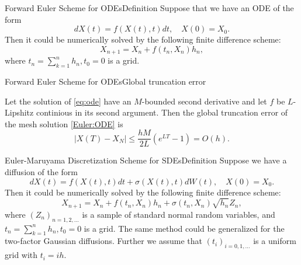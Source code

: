 \begin{frame}{Forward Euler Scheme for ODEs}{Definition}
    Suppose that we have an ODE of the form
    \begin{equation}
        dX(t) = f(X(t), t)dt, \quad X(0) = X_0. \label{eq:ode}
    \end{equation}
    Then it could be numerically solved by the following finite difference scheme:
    \begin{equation}
        X_{n+1} = X_n + f(t_n, X_n)h_n, \label{Euler:ODE}
    \end{equation}
    where $t_n = \sum_{k=1}^n h_n, t_0 = 0$ is a grid. 
\end{frame}

\begin{frame}{Forward Euler Scheme for ODEs}{Global truncation error}
    \begin{lemma}
        Let the solution of \eqref{eq:ode} have an $M$-bounded second derivative and let $f$ be $L$-Lipshitz continious in its second argument. Then the global truncation error of the mesh solution \eqref{Euler:ODE} is
        \begin{equation}
            \left|X(T) - X_N\right| \leq \frac{hM}{2L}\left(e^{LT} - 1\right) = O(h).
        \end{equation}
    \end{lemma}
\end{frame}

\begin{frame}{Euler-Maruyama Discretization Scheme for SDEs}{Definition}
    Suppose we have a diffusion of the form 
    \begin{equation*}
        dX(t) = f(X(t), t)dt + \sigma(X(t), t)dW(t), \quad X(0) = X_0.
    \end{equation*}
    Then it could be numerically solved by the following finite difference scheme:
    \begin{equation}
        X_{n+1} = X_n + f(t_n, X_n)h_n + \sigma(t_n, X_n) \sqrt{h_n} Z_n, \label{Euler:SDE}
    \end{equation}
    where $(Z_n)_{n=1, 2, \dots}$ is a sample of standard normal random variables, and $t_n = \sum_{k=1}^n h_n, t_0 = 0$ is a grid.
    The same method could be generalized for the two-factor Gaussian diffusions. Further we assume
    that $(t_i)_{i = 0, 1, \dots}$ is a uniform grid with $t_i = ih$.
\end{frame}

